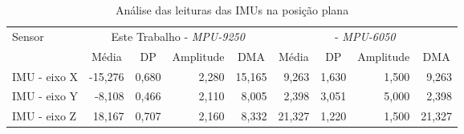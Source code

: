 \begin{table}[H]
  \centering
  \footnotesize
  \setlength{\abovecaptionskip}{0pt}
  \setlength{\belowcaptionskip}{0pt}
  \caption[Análise das leituras das \ac{IMU}s na posição plana]{Análise das leituras das \ac{IMU}s na posição plana}
  \label{tab:imu_est_plan}
\begin{tabular}{l|rrrr|rrrr}
    \hline\hline
	\multirow{2}{*}{Sensor} & \multicolumn{4}{c|}{Este Trabalho - \textit{MPU-9250}} & \multicolumn{4}{c}{\citeonline{roversi} - \textit{MPU-6050}} \\
	\cline{2-9}
    \multirow{1}{*}{} & \multicolumn{1}{c}{Média} & \multicolumn{1}{c}{\ac{DP}} & \multicolumn{1}{c}{Amplitude} & \multicolumn{1}{c|}{\ac{DMA}} & 
    \multicolumn{1}{c}{Média} & 
    \multicolumn{1}{c}{\ac{DP}} & \multicolumn{1}{c}{Amplitude} & \multicolumn{1}{c}{\ac{DMA}} \\
    \hline
IMU - eixo X & -15,276 & 0,680 & 2,280 & 15,165 & 9,263 & 1,630 & 1,500 & 9,263 \\
IMU - eixo Y & -8,108 & 0,466 & 2,110 & 8,005 & 2,398 & 3,051 & 5,000 & 2,398 \\
IMU - eixo Z & 18,167 & 0,707 & 2,160 & 8,332 & 21,327 & 1,220 & 1,500 & 21,327 \\
    \hline\hline
\end{tabular}
  \\\vspace{1.3mm}
\end{table}

